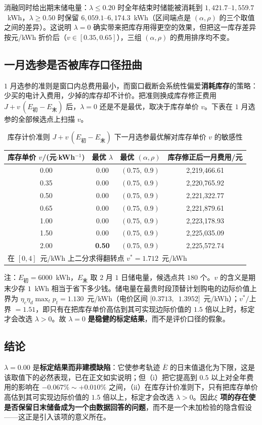 消融同时给出期末储电量：$\lambda\le0.20$ 时全年结束时储能被消耗到 $1,421.7$--$1,559.7$~kWh，$\lambda\ge0.50$ 时保留 $6,059.1$--$6,174.3$~kWh（区间端点是 $(\alpha,\rho)$ 的三个取值之间的差异）。这说明 $\lambda=0$ 确实带来把库存用得更空的效果，但把这一库存差异按元/kWh 折价后（$v\in[0.35,0.65]$），三组 $(\alpha,\rho)$ 的费用排序均不变。

\subsection{一月选参是否被库存口径扭曲}

$1$ 月选参的准则是窗口内总费用最小，而窗口截断会系统性偏爱\textbf{消耗库存}的策略：少买的电计入费用，少掉的库存却不计价。把准则换成库存修正费用 $J+v\,(E_{\text{初}}-E_{\text{末}})$ 后，$\lambda=0$ 还是不是最优，取决于库存单价 $v$。下表在 $1$ 月选参的全部候选点上扫描 $v$。

\begin{table}[htbp]
  \centering
  \caption{库存计价准则 $J+v\,(E_{\text{初}}-E_{\text{末}})$ 下一月选参最优解对库存单价 $v$ 的敏感性}
  \label{tab:p2-breakeven}
  \footnotesize
  \begin{tabular}{cccc}
    \toprule
    库存单价 $v$/(元$\cdot$kWh$^{-1}$) & 最优 $\lambda$ & 最优 $(\alpha,\rho)$ & 库存修正后一月费用/元 \\
    \midrule
    0.00 & 0.00 & $(0.75,\ 0.9)$ & 2,219,466.61 \\
    0.35 & 0.00 & $(0.75,\ 0.9)$ & 2,220,765.92 \\
    0.50 & 0.00 & $(0.75,\ 0.9)$ & 2,221,322.77 \\
    0.65 & 0.00 & $(0.75,\ 0.9)$ & 2,221,879.61 \\
    1.00 & 0.00 & $(0.75,\ 0.9)$ & 2,223,178.93 \\
    1.50 & 0.00 & $(0.75,\ 0.9)$ & 2,225,035.09 \\
    2.00 & \textbf{0.50} & $(0.75,\ 0.9)$ & 2,225,572.74 \\
    \midrule
    \multicolumn{4}{l}{\footnotesize 在 $[0,4]$~元/kWh 上二分求得翻转点 $v^*=1.712$~元/kWh} \\
    \bottomrule
  \end{tabular}
  \par\vspace{2pt}
  \begin{minipage}{.94\textwidth}\footnotesize
    注：$E_{\text{初}}=6000$~kWh，$E_{\text{末}}$ 取 $2$ 月 $1$ 日储电量，候选点共 $180$ 个。$v$ 的含义是期末少存 $1$~kWh 相当于省下多少钱。储电量在最贵时段顶替计划购电的边际价值上界为 $\eta_c\eta_d\max_t p_t=1.130$~元/kWh（电价区间 $[0.3713,$~$1.3952]$~元/kWh）；$v^*/$上界 $=1.51$，即只有在把库存单价高估到其可实现边际价值的 $1.5$ 倍以上时，标定才会改选 $\lambda>0$。故 $\lambda=0$ \textbf{是稳健的标定结果}，而不是评价口径的假象。
  \end{minipage}
\end{table}

\subsection{结论}

$\lambda=0.00$ 是\textbf{标定结果而非建模缺陷}：它使参考轨迹 $\bar E$ 的日末值退化为下限，这是该取值下的必然表现，已在正文如实说明；但（i）把它提高到 $0.5$ 以上对全年费用的影响在 $-0.067\%\sim+0.010\%$ 之间，（ii）在库存计价准则下，只有把库存单价高估到其可实现边际价值的 $1.5$ 倍以上，标定才会改选 $\lambda>0$。因此\textbf{$\xi$ 项的存在使是否保留日末储备成为一个由数据回答的问题}，而不是一个未加检验的隐含假设——这正是引入该项的意义所在。
